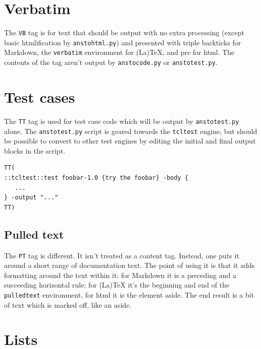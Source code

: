 \section{Verbatim}
\label{verbatim}

The \texttt{VB} tag is for text that should be output with no extra processing (except basic htmlification by \texttt{anstohtml.py}) and presented with triple backticks for Markdown, the \texttt{verbatim} environment for (La)TeX, and pre for html. The contents of the tag aren't output by \texttt{anstocode.py} or \texttt{anstotest.py}.

\section{Test cases}
\label{test-cases}

The \texttt{TT} tag is used for test case code which will be output by \texttt{anstotest.py} alone. The \texttt{anstotest.py} script is geared towards the \texttt{tcltest} engine, but should be possible to convert to other test engines by editing the initial and final output blocks in the script.

\begin{verbatim}
TT(
::tcltest::test foobar-1.0 {try the foobar} -body {
   ...
} -output "..."
TT)
\end{verbatim}

\begin{pulledtext}

\section{Pulled text}
\label{pulled-text}

The \texttt{PT} tag is different. It isn't treated as a content tag. Instead, one puts it around a short range of documentation text. The point of using it is that it adds formatting around the text within it: for Markdown it is a preceding and a succeeding horizontal rule; for (La)TeX it's the beginning and end of the \texttt{pulledtext} environment, for html it is the element aside. The end result is a bit of text which is marked off, like an aside.
\end{pulledtext}

\section{Lists}
\label{lists}

